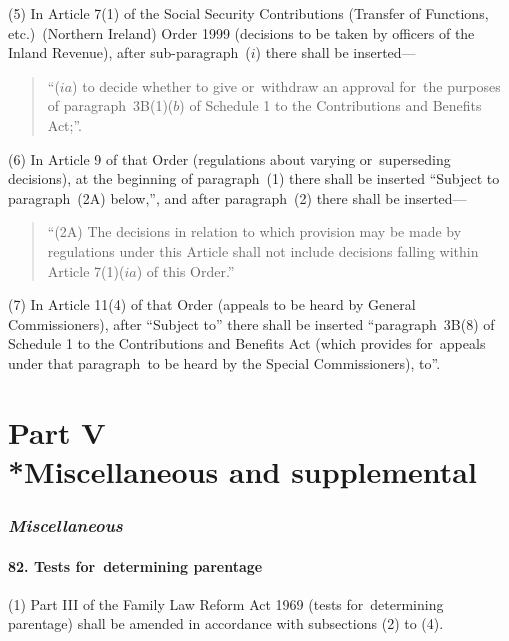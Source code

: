 \documentclass[12pt,a4paper]{article}
\begin{document}
(5) In Article 7(1)  of the Social Security Contributions (Transfer of Functions, etc.)\ (Northern Ireland) Order 1999 (decisions to be taken by officers of the Inland Revenue), after sub-paragraph~($i$)  there shall be inserted—
\begin{quotation}
“($ia$) to decide whether to give or~withdraw an approval for~the purposes of paragraph~3B(1)($b$)  of Schedule 1 to the Contributions and Benefits Act;”.
\end{quotation}

(6) In Article 9 of that Order (regulations about varying or~superseding decisions), at the beginning of paragraph~(1)  there shall be inserted “Subject to paragraph~(2A)  below,”, and after paragraph~(2)  there shall be inserted—
\begin{quotation}
“(2A) The decisions in relation to which provision may be made by regulations under this Article shall not include decisions falling within Article 7(1)($ia$) of this Order.”
\end{quotation}

(7) In Article 11(4)  of that Order (appeals to be heard by General Commissioners), after “Subject to” there shall be inserted “paragraph~3B(8)  of Schedule 1 to the Contributions and Benefits Act (which provides for~appeals under that paragraph~to be heard by the Special Commissioners), to”.

\part[Part V --- Miscellaneous and supplemental]{Part V\\*Miscellaneous and supplemental}

\renewcommand\parthead{--- Part V}

\section{\itshape Miscellaneous}

\subsection{82. Tests for~determining parentage}

(1) Part III of the Family Law Reform Act 1969 (tests for~determining parentage) shall be amended in accordance with subsections (2)  to (4).
\end{document}
